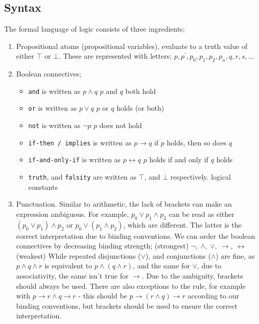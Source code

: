 \documentclass[a4paper, 12pt]{article}
\begin{document}
        \subsection*{Syntax}
            The formal language of logic consists of three ingredients;
            \begin{enumerate}[1.]
                \itemsep0em
                \item Propositional atoms (propositional variables), evaluate to a truth value of either $\top$ or $\bot$. These are represented with letters; $p, p^\prime, p_0, p_1, p_2, p_n, q, r, s, ...$
                \item Boolean connectives;
                    \begin{itemize}
                        \itemsep0em
                        \item \texttt{and} is written as $p \land q$ \hfill $p$ and $q$ both hold
                        \item \texttt{or} is written as $p \lor q$ \hfill $p$ or $q$ holds (or both)
                        \item \texttt{not} is written as $\neg p$ \hfill $p$ does not hold
                        \item \texttt{if-then / implies} is written as $p \rightarrow q$ \hfill if $p$ holds, then so does $q$
                        \item \texttt{if-and-only-if} is written as $p \leftrightarrow q$ \hfill $p$ holds if and only if $q$ holds
                        \item \texttt{truth}, and \texttt{falsity} are written as $\top$, and $\bot$ respectively. \hfill logical constants
                    \end{itemize}
                \item Punctuation. Similar to arithmetic, the lack of brackets can make an expression ambiguous. For example, $p_0 \lor p_1 \land p_2$ can be read as either $(p_0 \lor p_1) \land p_2$ or $p_0 \lor (p_1 \land p_2)$, which are different. The latter is the correct interpretation due to binding conventions.
                    \subitem We can order the boolean connectives by decreasing binding strength;
                    \subitem (strongest) $\neg,\ \land,\ \lor,\ \rightarrow,\ \leftrightarrow$ (weakest)
                    \subitem While repeated disjunctions ($\lor$), and conjunctions ($\land$) are fine, as $p \land q \land r$ is equivalent to $p \land (q \land r)$, and the same for $\lor$, due to associativity, the same isn't true for $\rightarrow$. Due to the ambiguity, brackets should always be used.
                    \subitem There are also exceptions to the rule, for example with $p \rightarrow r \land q \rightarrow r$ - this should be $p \rightarrow (r \land q) \rightarrow r$ according to our binding conventions, but brackets should be used to ensure the correct interpretation.
            \end{enumerate}
\end{document}
